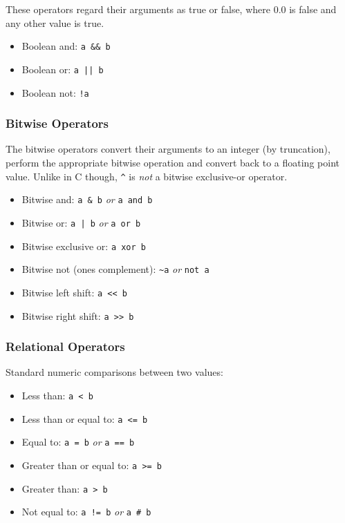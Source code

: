 These operators regard their arguments as true or false, where 0.0 is false and any other value is true.

\begin{itemize}
\item Boolean and: \verb|a && b|

\item Boolean or: \verb+a || b+

\item Boolean not: \verb|!a|

\end{itemize}

\subsubsection{Bitwise Operators}

The bitwise operators convert their arguments to an integer (by truncation), perform the appropriate bitwise operation and convert back to a floating point value.
Unlike in C though, \verb|^| is \emph{not} a bitwise exclusive-or operator.

\begin{itemize}
\item Bitwise and: \verb|a & b| \emph{or} \verb|a and b|

\item Bitwise or: \verb+a | b+ \emph{or} \verb|a or b|

\item Bitwise exclusive or: \verb|a xor b|

\item Bitwise not (ones complement): \verb|~a| \emph{or} \verb|not a|

\item Bitwise left shift: \verb|a << b|

\item Bitwise right shift: \verb|a >> b|

\end{itemize}

\subsubsection{Relational Operators}

Standard numeric comparisons between two values:

\begin{itemize}
\item Less than: \verb|a < b|

\item Less than or equal to: \verb|a <= b|

\item Equal to: \verb|a = b| \emph{or} \verb|a == b|

\item Greater than or equal to: \verb|a >= b|

\item Greater than: \verb|a > b|

\item Not equal to: \verb|a != b| \emph{or} \verb|a # b|

\end{itemize}

